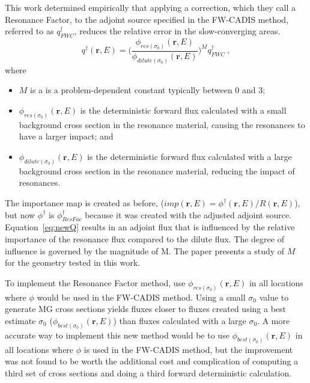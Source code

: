 \documentclass[12pt,twoside]{article}
\newcommand{\ve}[1]{\ensuremath{\mathbf{#1}}}
\begin{document}
This work determined empirically that applying a correction, which they call a Resonance Factor, to the adjoint source specified in the FW-CADIS method, referred to as $q^{\dagger}_{FWC}$, reduces the relative error in the slow-converging areas. 
%
\begin{equation}
   q^{\dagger}(\ve{r},E) = \bigl(\frac{\phi_{res(\sigma_0)}(\ve{r},E)}{\phi_{dilute(\sigma_0)}(\ve{r},E)}\bigr)^M q^{\dagger}_{FWC} \:,
   \label{eq:newQ}
\end{equation}
%
where
\begin{itemize}
  \item $M$ is a is a problem-dependent constant typically between 0 and 3;
  \item $\phi_{res(\sigma_0)}(\ve{r},E)$ is the deterministic forward flux calculated with a small background cross section in the resonance material, causing the resonances to have a larger impact; and
  \item $\phi_{dilute(\sigma_0)}(\ve{r},E)$ is the deterministic forward flux calculated with a large background cross section in the resonance material, reducing the impact of resonances. 
\end{itemize}

The importance map is created as before, ($imp(\ve{r},E)= \phi^{\dagger} (\ve{r},E)/R(\ve{r},E)$), but now $\phi^{\dagger}$ is $\phi_{ResFac}^{\dagger}$ because it was created with the adjusted adjoint source. Equation~\eqref{eq:newQ} results in an adjoint flux that is influenced by the relative importance of the resonance flux compared to the dilute flux. The degree of influence is governed by the magnitude of M. The paper presents a study of $M$ for the geometry tested in this work.

To implement the Resonance Factor method, use $\phi_{res(\sigma_0)}(\ve{r},E)$  in all locations where $\phi$ would be used in the FW-CADIS method. Using a small $\sigma_0$ value to generate MG cross sections yields fluxes closer to fluxes created using a best estimate $\sigma_0$ ($\phi_{best(\sigma_0)}(\ve{r},E)$) than fluxes calculated with a large $\sigma_0$. A more accurate way to implement this new method would be to use $\phi_{best(\sigma_0)}(\ve{r},E)$ in all locations where $\phi$ is used in the FW-CADIS method, but the improvement was not found to be worth the additional cost and complication of computing a third set of cross sections and doing a third forward deterministic calculation.
\end{document}
